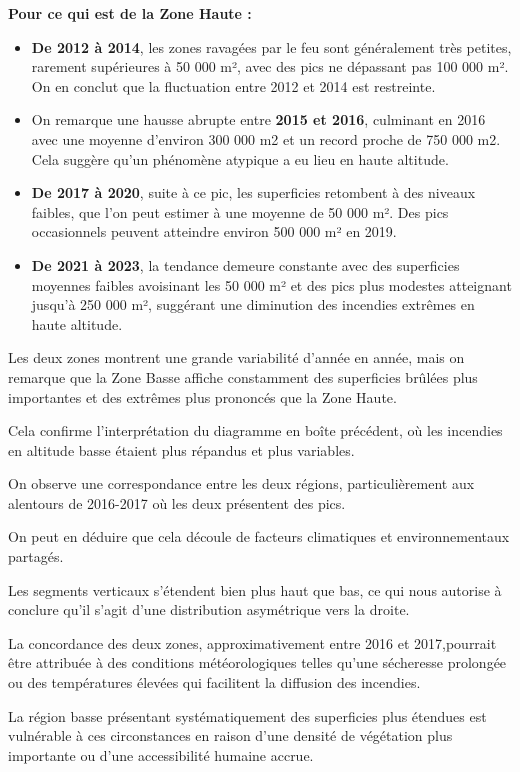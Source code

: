 \documentclass[
]{article}
\begin{document}
\textbf{Pour ce qui est de la Zone Haute :}

\begin{itemize}
\item
  \textbf{De 2012 à 2014}, les zones ravagées par le feu sont
  généralement très petites, rarement supérieures à 50 000 m², avec des
  pics ne dépassant pas 100 000 m². On en conclut que la fluctuation
  entre 2012 et 2014 est restreinte.
\item
  On remarque une hausse abrupte entre \textbf{2015 et 2016}, culminant
  en 2016 avec une moyenne d'environ 300 000 m2 et un record proche de
  750 000 m2. Cela suggère qu'un phénomène atypique a eu lieu en haute
  altitude.
\item
  \textbf{De 2017 à 2020}, suite à ce pic, les superficies retombent à
  des niveaux faibles, que l'on peut estimer à une moyenne de 50 000 m².
  Des pics occasionnels peuvent atteindre environ 500 000 m² en 2019.
\item
  \textbf{De 2021 à 2023}, la tendance demeure constante avec des
  superficies moyennes faibles avoisinant les 50 000 m² et des pics plus
  modestes atteignant jusqu'à 250 000 m², suggérant une diminution des
  incendies extrêmes en haute altitude.
\end{itemize}

Les deux zones montrent une grande variabilité d'année en année, mais on
remarque que la Zone Basse affiche constamment des superficies brûlées
plus importantes et des extrêmes plus prononcés que la Zone Haute.

Cela confirme l'interprétation du diagramme en boîte précédent, où les
incendies en altitude basse étaient plus répandus et plus variables.

On observe une correspondance entre les deux régions, particulièrement
aux alentours de 2016-2017 où les deux présentent des pics.

On peut en déduire que cela découle de facteurs climatiques et
environnementaux partagés.

Les segments verticaux s'étendent bien plus haut que bas, ce qui nous
autorise à conclure qu'il s'agit d'une distribution asymétrique vers la
droite.

La concordance des deux zones, approximativement entre 2016 et
2017,pourrait être attribuée à des conditions météorologiques telles
qu'une sécheresse prolongée ou des températures élevées qui facilitent
la diffusion des incendies.

La région basse présentant systématiquement des superficies plus
étendues est vulnérable à ces circonstances en raison d'une densité de
végétation plus importante ou d'une accessibilité humaine accrue.
\end{document}
